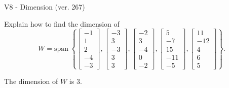 \begin{exercise}
  \begin{exerciseTitle}V8 - Dimension (ver. 267)\end{exerciseTitle}
  \begin{exerciseStatement}
    Explain how to find the dimension of 
\[W=\mathrm{span}\ \left\{\left[\begin{array}{r}
-1 \\
1 \\
2 \\
-4 \\
-3
\end{array}\right] , \left[\begin{array}{r}
-3 \\
3 \\
-3 \\
3 \\
3
\end{array}\right] , \left[\begin{array}{r}
-2 \\
3 \\
-4 \\
0 \\
-2
\end{array}\right] , \left[\begin{array}{r}
5 \\
-7 \\
15 \\
-11 \\
-5
\end{array}\right] , \left[\begin{array}{r}
11 \\
-12 \\
4 \\
6 \\
5
\end{array}\right]\right\}.\]



  \end{exerciseStatement}
  \begin{exerciseAnswer}
   The dimension of \(W\) is  \(3\).
  


  \end{exerciseAnswer}
\end{exercise}